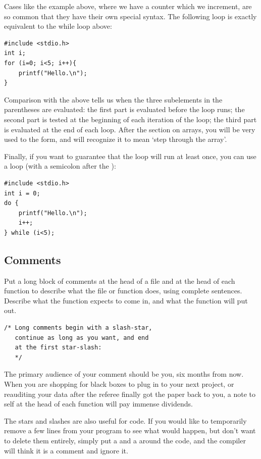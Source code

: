 \documentclass[12pt]{article}
\makeatletter
\def\ttind#1{\index{#1@\cinline{#1}}\cinline{#1}}
\makeatother
\begin{document}
Cases like the example above, where we have a counter which we increment,
are so common that they have their own special syntax. The following
\ttind{for} loop is exactly equivalent to the while loop above:

\begin{lstlisting}
#include <stdio.h>
int i;
for (i=0; i<5; i++){
    printf("Hello.\n");
}
\end{lstlisting}

Comparison with the above tells us when the three subelements in the
parentheses are evaluated: the first part is evaluated before the
loop runs; the second part is tested at the beginning of each
iteration of the loop; the third part is evaluated at the end of each
loop. After the section on arrays, you will be very used to the 
 form, and will recognize it to mean `step
through the array'.

Finally, if you want to guarantee that the loop will run at least once, you can use a \ttind{do-while} loop (with a semicolon after the ):

\begin{lstlisting}
#include <stdio.h>
int i = 0;
do {
    printf("Hello.\n");
    i++;
} while (i<5);
\end{lstlisting}

\subsection{Comments} 
Put a long block of comments 
at the head of a file and at the head of each function to describe what
the file or function does, using complete sentences. Describe what the
function expects to come in, and what the function will put out.
\begin{verbatim}
/* Long comments begin with a slash-star,
   continue as long as you want, and end 
   at the first star-slash:   
   */
\end{verbatim}
The primary audience of your comment should be you, six months from
now. When you are shopping for black boxes to plug in to your next project,
or reauditing your data after the referee finally got the paper back
to you, a note to self at the head of each function will pay immense
dividends.


The stars and slashes are also useful for  code. If
you would
like to temporarily remove a few lines from your program to see what
would
happen, but don't want to delete them entirely, simply put a \cinline{/*}
and a \cinline{*/} around the code, and the compiler will think it is a
comment and ignore it.
\end{document}
